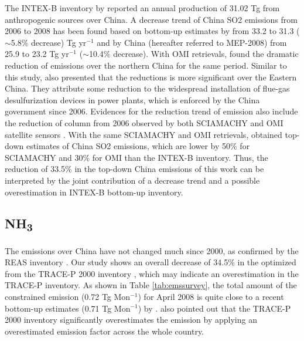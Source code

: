   The INTEX-B inventory by \citet{zhang09b} reported an annual production of 31.02 Tg from anthropogenic sources over China. 
A decrease trend of China SO2 emissions from 2006 to 2008 has been found based on bottom-up estimates by \citet{lu10} from 33.2 to 31.3 ( $\sim$5.8\% decrease) Tg yr$^{-1}$
and by China \citet{mep09} (hereafter referred to MEP-2008) from 25.9 to 23.2 Tg yr$^{-1}$ ($\sim$10.4\% decrease).
With OMI  retrievals, \citet{lu10} found the dramatic reduction of  emissions over the northern China for the same period. 
Similar to this study, \citet{lu10} also presented that the reductions is more significant over the Eastern China. 
They attribute some reduction to the widespread installation of flue-gas desulfurization devices in power plants, which is enforced by the China government since 2006. 
Evidences for the reduction trend of  emission also include the reduction of  column from 2006 observed by both SCIAMACHY and OMI satellite sensors \citep{lu11}.
With the same SCIAMACHY and OMI  retrievals, \citet{lee11} obtained top-down estimates of China SO2 emissions, 
which are lower by 50\% for SCIAMACHY and 30\% for OMI than the INTEX-B inventory. 
Thus, the reduction of 33.5\% in the top-down China  emissions of this work can be interpreted by the joint contribution of a decrease trend and a possible overestimation in INTEX-B bottom-up inventory.

 \subsection{NH\textsubscript{3} } 

  The  emissions over China have not changed much since 2000, as confirmed by the REAS inventory \citep{ohara07}.
Our study shows an overall decrease of 34.5\% in the optimized from the TRACE-P 2000 inventory \citep{streets03},
which may indicate an overestimation in the TRACE-P inventory. 
As shown in Table \ref{tab:emssurvey}, the total amount of the constrained  emission (0.72 Tg Mon$^{-1}$) for April 2008 is quite close to a recent bottom-up estimates (0.71 Tg Mon$^{-1}$) by \citet{Huang12}. 
\citet{Huang12} also pointed out that the TRACE-P 2000 inventory significantly overestimates the  emission by applying an overestimated emission factor across the whole country. 

